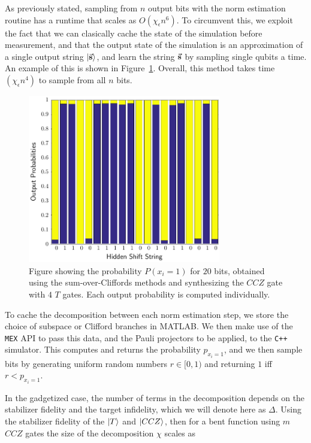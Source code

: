 As previously stated, sampling from $n$ output bits with the norm estimation routine has a runtime that scales as $O\left(\chi_{\epsilon}n^{6}\right)$. To circumvent this, we exploit the fact that we can clasically cache the state of the simulation before measurement, and that the output state of the simulation is an approximation of a single output string $\ket{\va{s}}$, and learn the string $\va{s}$ by sampling single qubits a time. An example of this is shown in Figure~\ref{fig:hs_readout}. Overall, this method takes time $\left(\chi_{\epsilon}n^{4}\right)$ to sample from all $n$ bits.\par
\begin{figure}[t]
\centering
\includegraphics[width=0.75\textwidth]{Figures/HiddenShiftHistogram.pdf}
\caption{Figure showing the probability $P\left(x_{i}=1\right)$ for $20$ bits, obtained using the sum-over-Cliffords methods and synthesizing the $CCZ$ gate with $4$ $T$ gates. Each output probability is computed individually.}
\label{fig:hs_readout}
\end{figure}
To cache the decomposition between each norm estimation step, we store the choice of subspace or Clifford branches in MATLAB. We then make use of the \texttt{MEX} API to pass this data, and the Pauli projectors to be applied, to the \texttt{C++} simulator. This computes and returns the probability $p_{x_{i}=1}$, and we then sample bits by generating uniform random numbers $r\in [0,1)$ and returning $1$ iff $r<p_{x_{i}=1}$.\par
In the gadgetized case, the number of terms in the decomposition depends on the stabilizer fidelity and the target infidelity, which we will denote here as $\Delta$. Using the stabilizer fidelity of the $\ket{T}$ and $\ket{CCZ}$, then for a bent function using $m$ $CCZ$ gates the size of the decomposition $\chi$ scales as
